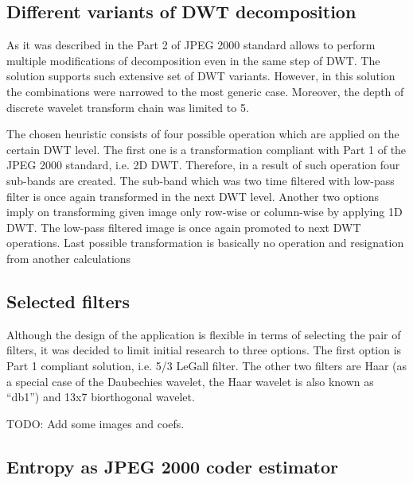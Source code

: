 \subsection{Different variants of DWT decomposition} \label{sec:dwt_decompositions}

As it was described in  the Part 2 of JPEG 2000 standard allows to perform
multiple modifications of decomposition even in the same step of DWT. The  solution supports
such extensive set of DWT variants. However, in this solution the combinations were narrowed to the most
generic case. Moreover, the depth of discrete wavelet transform chain was limited to 5.

The chosen heuristic consists of four possible operation which are applied on the certain DWT level.
The first one is a transformation compliant with Part 1 of the JPEG 2000 standard, i.e. 2D DWT. Therefore, in a result
of such operation four sub-bands are created. The sub-band which was two time filtered with low-pass filter
is once again transformed in the next DWT level. Another two options imply on transforming given image only
row-wise or column-wise by applying 1D DWT. The low-pass filtered image is once again promoted to next DWT operations.
Last possible transformation is basically no operation and resignation from another calculations

\subsection{Selected filters}

Although the design of the application is flexible in terms of selecting the pair of filters, it was decided
to limit initial research to three options. The first option is Part 1 compliant solution, i.e. 5/3 LeGall filter.
The other two filters are Haar (as a special case of the Daubechies wavelet, the Haar wavelet is also known as ``db1'')
and 13x7 biorthogonal wavelet.

TODO: Add some images and coefs.

\subsection{Entropy as JPEG 2000 coder estimator}

